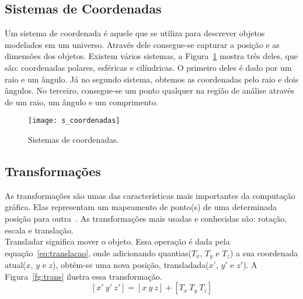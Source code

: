 
\subsection{Sistemas de Coordenadas}
Um sistema de coordenada é aquele que se utiliza para descrever objetos modelados em um universo. Através dele consegue-se capturar a posição e as dimensões dos objetos. Existem vários sistemas, a Figura~\ref{fg:coordenadas} mostra três deles, que são: coordenadas polares, esféricas e cilíndricas. O primeiro deles é dado por um raio e um ângulo. Já no segundo sistema, obtemos as coordenadas pelo raio e dois ângulos. No terceiro, consegue-se um ponto qualquer na região de análise através de um raio, um ângulo e um comprimento.\\ 

\begin{figure}[ht!]
	\centering
	\texttt{[image: s\_coordenadas]}
	\caption{Sistemas de coordenadas.}
	\label{fg:coordenadas}
\end{figure}

\subsection{Transformações}
As transformações são umas das características mais importantes da computação gráfica. Elas representam um mapeamento de ponto(s) de uma determinada posição para outra~\cite{comp_grafica1}. As transformações mais usadas e conhecidas são: rotação, escala e translação.\\

Transladar significa mover o objeto. Essa operação é dada pela equação~\ref{eq:translacao}, onde adicionando quantias($T_x$, $T_y$ e $T_z$) a sua coordenada atual($x$, $y$ e $z$), obtém-se uma nova posição, transladada($x'$, $y'$ e $z'$). A Figura~\ref{fg:trans} ilustra essa transformação. \\

\begin{equation}\label{eq:translacao}
[x'\ y'\ z'] = [x\ y\ z] + [T_{x}\ T_{y}\ T_{z}]
\end{equation}

